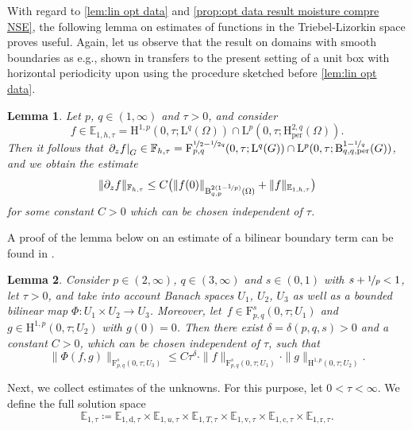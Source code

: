 \documentclass[10pt]{amsart}
\theoremstyle{plain}
\newtheorem{lem}[lem]{Lemma}
\theoremstyle{definition}
\theoremstyle{thm}
\numberwithin{equation}{section}
\newcommand{\rL}{\mathrm{L}}
\newcommand{\rLq}{\rL^q}
\newcommand{\rLp}{\rL^p}
\newcommand{\rH}{\mathrm{H}}
\newcommand{\rB}{\mathrm{B}}
\newcommand{\rF}{\mathrm{F}}
\newcommand{\E}{\mathbb{E}}
\newcommand{\F}{\mathbb{F}}
\newcommand{\del}{\partial}
\newcommand{\per}{\mathrm{per}}
\newcommand{\dz}{\del_z}
\newcommand{\rd}{\mathrm{d}}
\newcommand{\rr}{\mathrm{r}}
\newcommand{\rv}{\mathrm{v}}
\newcommand{\rc}{\mathrm{c}}
\begin{document}
With regard to \autoref{lem:lin opt data} and \autoref{prop:opt data result moisture compre NSE}, the following lemma on estimates of functions in the Triebel-Lizorkin space proves useful.
Again, let us observe that the result on domains with smooth boundaries as e.g., shown in \cite[Prop.~6.4]{DHP:07} transfers to the present setting of a unit box with horizontal periodicity upon using the procedure sketched before \autoref{lem:lin opt data}.

\begin{lem}\label{lem:est of normal derivative}
Let $p$, $q \in (1,\infty)$ and $\tau > 0$, and consider
\begin{equation*}
    f \in \E_{1,h,\tau} = \rH^{1,p}(0,\tau;\rLq(\Omega)) \cap \rLp(0,\tau;\rH_\per^{2,q}(\Omega)).
\end{equation*}
Then it follows that $\left.\dz f\right|_G \in \F_{h,\tau} = \rF_{p,q}^{\nicefrac{1}{2}-\nicefrac{1}{2q}}(0,\tau;\rLq(G)) \cap \rLp(0,\tau;\rB_{q,q, \per}^{1 - \nicefrac{1}{q}}(G))$, and we obtain the estimate
\begin{equation*}
    \| \dz f \|_{\F_{h,\tau}} \le C \bigl(\| f(0) \|_{\rB_{q,p}^{2(1-\nicefrac{1}{p})}(\Omega)} + \| f \|_{\E_{1,h,\tau}}\bigr)
\end{equation*}
for some constant $C > 0$ which can be chosen independent of $\tau$.
\end{lem}

A proof of the lemma below on an estimate of a bilinear boundary term can be found in \cite[Prop.~2.7]{HMTT:19}.

\begin{lem}\label{lem:est of bilin term on boundary}
Consider $p \in (2,\infty)$, $q \in (3,\infty)$ and $s \in (0,1)$ with $s + \nicefrac{1}{p} < 1$, let $\tau > 0$, and take into account Banach spaces $U_1$, $U_2$, $U_3$ as well as a bounded bilinear map $\Phi \colon U_1 \times U_2 \to U_3$.
Moreover, let~$f \in \rF_{p,q}^s(0,\tau;U_1)$ and $g \in \rH^{1,p}(0,\tau;U_2)$ with $g(0) = 0$.
Then there exist $\delta = \delta(p,q,s) > 0$ and a constant $C > 0$, which can be chosen independent of $\tau$, such that
\begin{equation*}
    \| \Phi(f,g) \|_{\rF_{p,q}^s(0,\tau;U_3)} \le C \tau^{\delta} \cdot \| f \|_{\rF_{p,q}^s(0,\tau;U_1)} \cdot \| g \|_{\rH^{1,p}(0,\tau;U_2)}.
\end{equation*}
\end{lem}

Next, we collect estimates of the unknowns.
For this purpose, let $0<\tau< \infty$. 
We define the full solution space
\begin{equation}\label{eq:full sol space}
    \E_{1,\tau} \coloneqq \E_{1,\rd,\tau} \times \E_{1,u,\tau} \times \E_{1,T,\tau} \times \E_{1,\rv,\tau} \times \E_{1,\rc,\tau} \times \E_{1,\rr,\tau}.
\end{equation}
\end{document}

